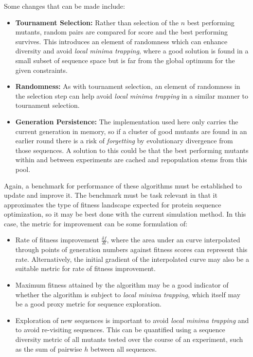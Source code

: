 \documentclass[16pt]{book}
\begin{document}
Some changes that can be made include:
\begin{itemize}
	\item \textbf{Tournament Selection:} Rather than selection of the $n$ best performing mutants, random pairs are compared for score and the best performing survives.
		This introduces an element of randomness which can enhance diversity and avoid \textit{local minima trapping}, where a good solution is found in a small subset of sequence space but is far from the global optimum for the given constraints.
	\item \textbf{Randomness:} As with tournament selection, an element of randomness in the selection step can help avoid \textit{local minima trapping} in a similar manner to tournament selection.
	\item \textbf{Generation Persistence:} The implementation used here only carries the current generation in memory, so if a cluster of good mutants are found in an earlier round there is a risk of \textit{forgetting} by evolutionary divergence from those sequences. 
		A solution to this could be that the best performing mutants within and between experiments are cached and repopulation stems from this pool.
\end{itemize}

Again, a benchmark for performance of these algorithms must be established to update and improve it.
The benchmark must be task relevant in that it approximates the type of fitness landscape expected for protein sequence optimization, so it may be best done with the current simulation method.
In this case, the metric for improvement can be some formulation of:

\begin{itemize}
	\item Rate of fitness improvement $\frac{\delta f}{\delta t}$, where the area under an curve interpolated through points of generation numbers against fitness scores can represent this rate.
		Alternatively, the initial gradient of the interpolated curve may also be a suitable metric for rate of fitness improvement.
	\item Maximum fitness attained by the algorithm may be a good indicator of whether the algorithm is subject to \textit{local minima trapping}, which itself may be a good proxy metric for sequence exploration.
	\item Exploration of new sequences is important to avoid \textit{local minima trapping} and to avoid re-visiting sequences.
		This can be quantified using a sequence diversity metric of all mutants tested over the course of an experiment, such as the sum of pairwise $h$ between all sequences.
\end{itemize}
\end{document}
